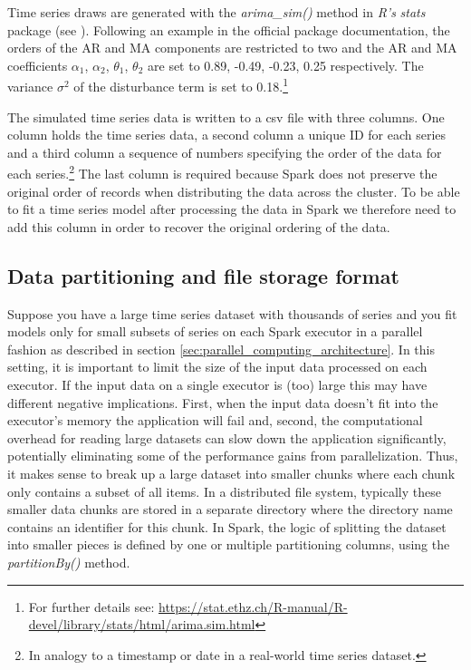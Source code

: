 \documentclass[11pt]{article}
\renewcommand{\cite}{\citet}
\begin{document}
Time series draws are generated with the \emph{arima\_sim()} method in \emph{R's} \emph{stats} package (see \cite{R2016}). Following an example in the official package documentation, the orders of the AR and MA components are restricted to two and the AR and MA coefficients $\alpha_1$, $\alpha_2$, $\theta_1$, $\theta_2$ are set to 0.89, -0.49, -0.23, 0.25 respectively. The variance $\sigma^{2}$ of the disturbance term is set to 0.18.\footnote{For further details see: \url{https://stat.ethz.ch/R-manual/R-devel/library/stats/html/arima.sim.html}}

The simulated time series data is written to a csv file with three columns. One column holds the time series data, a second column a unique ID for each series and a third column a sequence of numbers specifying the order of the data for each series.\footnote{In analogy to a timestamp or date in a real-world time series dataset.} The last column is required because Spark does not preserve the original order of records when distributing the data across the cluster. To be able to fit a time series model after processing the data in Spark we therefore need to add this column in order to recover the original ordering of the data.     

\subsection{Data partitioning and file storage format}
\label{sec:dataset_partitioning}

Suppose you have a large time series dataset with thousands of series and you fit models only for small subsets of series on each Spark executor in a parallel fashion as described in section \ref{sec:parallel_computing_architecture}. In this setting, it is important to limit the size of the input data processed on each executor. If the input data on a single executor is (too) large this may have different negative implications. First, when the input data doesn't fit into the executor's memory the application will fail and, second, the computational overhead for reading large datasets can slow down the application significantly, potentially eliminating some of the performance gains from parallelization. Thus, it makes sense to break up a large dataset into smaller chunks where each chunk only contains a subset of all items. In a distributed file system, typically these smaller data chunks are stored in a separate directory where the directory name contains an identifier for this chunk. In Spark, the logic of splitting the dataset into smaller pieces is defined by one or multiple partitioning columns, using the \emph{partitionBy()} method.   
\end{document}
